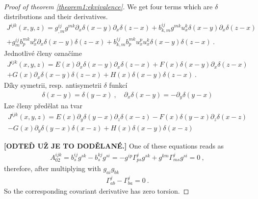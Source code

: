 \begin{proof}[Proof of theorem \ref{theorem1:ekvivalence}]


    We get four terms which are $\delta$ distributions and their derivatives.
    \begin{align*}
        J^{ijk}(x,y,z) =
        g^{ij}_{,m} g^{mk} \partial_x \delta(x-y) \partial_x \delta(z-x) 
        + b^{ij}_{k,m} g^{mk} u^k_x \delta(x-y) \partial_x \delta(z-x) 
        \\+ g^{ij}_m b^{mk}_p u^p_x  \partial_x \delta(x-y) \delta(z-x) 
        + b^{ij}_{k,m} b^{mk}_p u^p_x u^k_x \delta(x-y) \delta(z-x) \:.
    \end{align*}
    Jednotlivé členy označíme \begin{align*}
        J^{ijk}(x,y,z) = E(x) \partial_x \delta(x-y) \partial_x \delta(z-x) + F(x) \delta (x-y) \partial_x \delta(z-x) 
        \\+ G(x) \partial_x \delta(x-y) \delta(z-x) + H(x) \delta(x-y) \delta(z-x) \:.
    \end{align*}
    Díky symetrii, resp. antisymetrii $\delta$ funkcí
    \begin{align}
        \delta (x-y) = \delta(y-x) \:, \quad \partial_x \delta(x-y) = - \partial_y \delta(y-x)
    \end{align}
    Lze členy předělat na tvar
    \begin{align}
        J^{ijk}(x,y,z) = E(x) \partial_y \delta(y-x) \partial_z \delta(x-z) - F(x) \delta(y-x) \partial_z \delta(x-z) \\
        - G(x) \partial_y \delta(y-x) \delta(x-z) + H(x) \delta(x-y)  \delta(x-z)
    \end{align}


    \textbf{[ODTEĎ UŽ JE TO DODĚLANÉ.]}
    One of these equations reads as
    \begin{align}
        A_{02}^{ijk} = b^{ij}_s g^{sk} - b^{kj}_s g^{si} = -g^{ip} \Gamma^{j}_{ps} g^{sk} + g^{km} \Gamma^{j}_{ms} g^{si} =0 \:,
    \end{align}
    therefore, after multiplying with $g_{ai}g_{bk}$
    \begin{align}
        \Gamma^j_{ab} - \Gamma^j_{ba} = 0 \:.
    \end{align}
    So the corresponding covariant derivative has zero torsion.


\end{proof}
